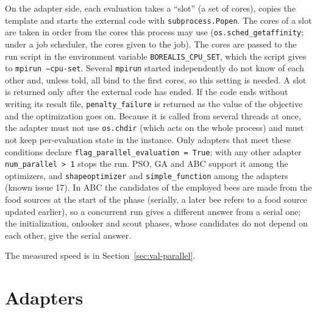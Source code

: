 \documentclass[11pt,a4paper]{article}
\begin{document}
On the adapter side, each evaluation takes a ``slot'' (a set of cores), copies the template and starts the external code with \texttt{subprocess.Popen}. The cores of a slot are taken in order from the cores this process may use (\texttt{os.sched\_getaffinity}; under a job scheduler, the cores given to the job). The cores are passed to the run script in the environment variable \texttt{BOREALIS\_CPU\_SET}, which the script gives to \texttt{mpirun --cpu-set}. Several \texttt{mpirun} started independently do not know of each other and, unless told, all bind to the first cores, so this setting is needed. A slot is returned only after the external code has ended. If the code ends without writing its result file, \texttt{penalty\_failure} is returned as the value of the objective and the optimization goes on. Because it is called from several threads at once, the adapter must not use \texttt{os.chdir} (which acts on the whole process) and must not keep per-evaluation state in the instance. Only adapters that meet these conditions declare \texttt{flag\_parallel\_evaluation = True}; with any other adapter \texttt{num\_parallel > 1} stops the run. PSO, GA and ABC support it among the optimizers, and \texttt{shapeoptimizer} and \texttt{simple\_function} among the adapters (known issue 17). In ABC the candidates of the employed bees are made from the food sources at the start of the phase (serially, a later bee refers to a food source updated earlier), so a concurrent run gives a different answer from a serial one; the initialization, onlooker and scout phases, whose candidates do not depend on each other, give the serial answer.

The measured speed is in Section~\ref{sec:val-parallel}.

\section{Adapters}\label{sec:adapters}
\end{document}
